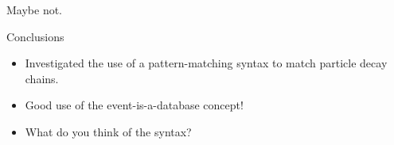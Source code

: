 \documentclass[aspectratio=169]{beamer}
\begin{document}
\begin{frame}{}
\Large
\vspace{1.25 cm}
\begin{center}
Maybe not.
\end{center}
\end{frame}

\begin{frame}{Conclusions}
\Large
\vspace{0.5 cm}
\begin{itemize}\setlength{\itemsep}{1 cm}
\item Investigated the use of a pattern-matching syntax to match particle decay chains.
\item Good use of the event-is-a-database concept!
\item What do you think of the syntax?
\end{itemize}
\end{frame}
\end{document}
